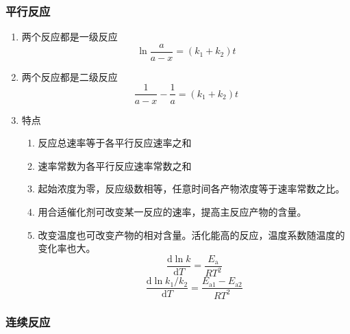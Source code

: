 \subsubsection{平行反应}

\begin{enumerate}
    \item 两个反应都是一级反应
    \begin{equation}
        \ln\frac{a}{a-x} = (k_1 + k_2) t
    \end{equation}
    \item 两个反应都是二级反应
    \begin{equation}
        \frac1{a-x} - \frac1a = (k_1 + k_2) t
    \end{equation}
    \item 特点
    \begin{enumerate}
        \item 反应总速率等于各平行反应速率之和
        \item 速率常数为各平行反应速率常数之和
        \item 起始浓度为零，反应级数相等，任意时间各产物浓度等于速率常数之比。
        \item 用合适催化剂可改变某一反应的速率，提高主反应产物的含量。
        \item 改变温度也可改变产物的相对含量。活化能高的反应，温度系数随温度的变化率也大。
        \begin{equation*}
            \frac{\mathrm{d}\ln{k}}{\mathrm{d}T} = \frac{E_\mathrm{a}}{RT^2}
        \end{equation*}
        \begin{equation*}
            \frac{\mathrm{d}\ln{k_1 / k_2}}{\mathrm{d}T} = \frac{E_{\mathrm{a}1}-E_{\mathrm{a}2}}{RT^2}
        \end{equation*}
    \end{enumerate}   
\end{enumerate}

\subsubsection{连续反应}

